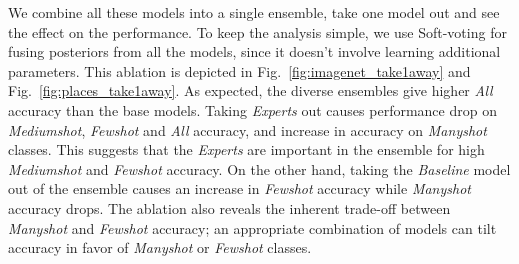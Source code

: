 \documentclass[runningheads]{llncs}
\begin{document}
\par We combine all these models into a single ensemble, take one model out and see the effect on the performance. To keep the analysis simple, we use Soft-voting for fusing posteriors from all the models, since it doesn't involve learning additional parameters. This ablation is depicted in Fig.~\ref{fig:imagenet_take1away} and Fig.~\ref{fig:places_take1away}. As expected, the diverse ensembles give higher \emph{All} accuracy than the base models. Taking \emph{Experts} out causes performance drop on \emph{Mediumshot}, \emph{Fewshot} and \emph{All} accuracy, and increase in accuracy on \emph{Manyshot} classes. This suggests that the \emph{Experts} are important in the ensemble for high \emph{Mediumshot} and \emph{Fewshot} accuracy. On the other hand, taking the \emph{Baseline} model out of the ensemble causes an increase in \emph{Fewshot} accuracy while \emph{Manyshot} accuracy drops. The ablation also reveals the inherent trade-off between \emph{Manyshot} and \emph{Fewshot} accuracy; an appropriate combination of models can tilt accuracy in favor of \emph{Manyshot} or \emph{Fewshot} classes. 
\end{document}
